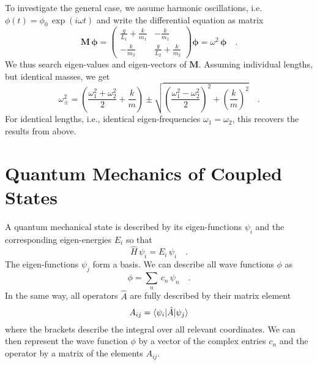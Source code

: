 To investigate the general case, we assume harmonic oscillations, i.e. $\phi(t) = \phi_0 \, \exp (i \omega t)$ and write the differential equation as matrix
\begin{equation} \boldsymbol{M \, \phi}	 = 
\begin{pmatrix}
  \frac{g}{L_1} +  \frac{k}{m_1}&  - \frac{k}{m_1}\\
 - \frac{k}{m_2} &  \frac{g}{L_2} +  \frac{k}{m_2}
\end{pmatrix}  \boldsymbol{\phi}	= \omega^2   \, \boldsymbol{\phi}
\quad .
\end{equation}
We thus search eigen-values and eigen-vectors of  $\boldsymbol{M}$. Assuming individual lengths, but identical masses, we get
\begin{equation}
 \omega_{\pm}^2 = \left( \frac{\omega_1^2 + \omega_2^2}{2}  + \frac{k}{m} \right)
  \pm \sqrt{  \left( \frac{\omega_1^2 - \omega_2^2}{2}   \right)^2 + \left(  \frac{k}{m} \right)^2 } \quad .
\end{equation}
For identical lengths, i.e., identical eigen-frequencies $\omega_1 = \omega_2$, this recovers the results from above.


\section{Quantum Mechanics of Coupled States}

A quantum mechanical state is described by its eigen-functions $\psi_i$ and the corresponding eigen-energies $E_i$ so that 
\begin{equation}
\hat{H}  \, \psi_i = E_i  \,\psi_i  \quad .
\end{equation}
The eigen-functions $\psi_j$ form a basis. We can describe all wave functions $\phi$ as
\begin{equation}
\phi = \sum_n \, c_n \, \psi_n \quad.
\end{equation}
In the same way, all operators $\hat{A}$ are fully described by their matrix element
\begin{equation}
 A_{ij} = \braket{ \psi_i | \hat{A} | \psi_j}
\end{equation}
where the brackets describe the integral over all relevant coordinates. We can then represent the wave function $\phi$ by a vector of the complex entries $c_n$ and the operator by a matrix of the elements $A_{ij}$.

